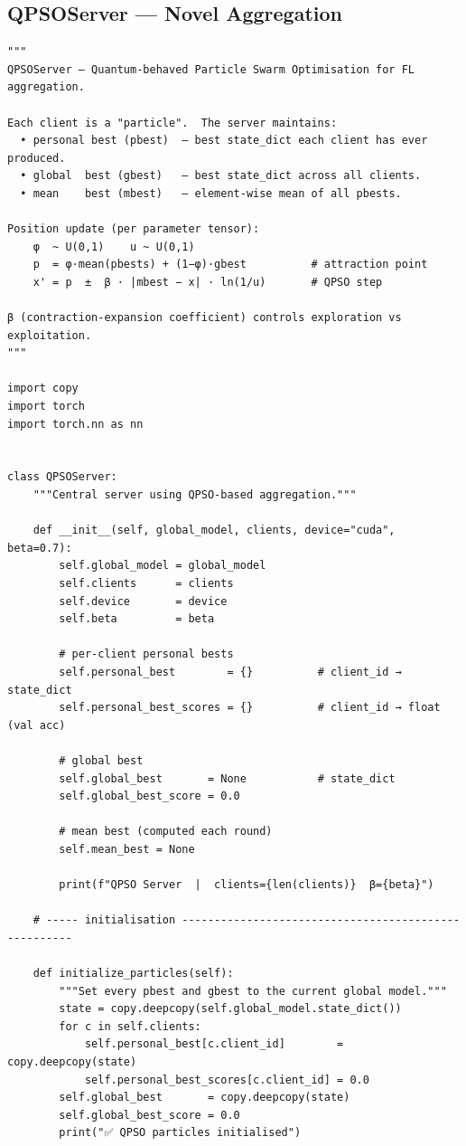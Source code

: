 \subsection{QPSOServer --- Novel Aggregation}
\begin{lstlisting}[caption={QPSO Server Aggregation (server\_qpso.py)}, label={lst:qpso}]
"""
QPSOServer — Quantum-behaved Particle Swarm Optimisation for FL aggregation.

Each client is a "particle".  The server maintains:
  • personal best (pbest)  — best state_dict each client has ever produced.
  • global  best (gbest)   — best state_dict across all clients.
  • mean    best (mbest)   — element-wise mean of all pbests.

Position update (per parameter tensor):
    φ  ~ U(0,1)    u ~ U(0,1)
    p  = φ·mean(pbests) + (1−φ)·gbest          # attraction point
    x' = p  ±  β · |mbest − x| · ln(1/u)       # QPSO step

β (contraction-expansion coefficient) controls exploration vs exploitation.
"""

import copy
import torch
import torch.nn as nn


class QPSOServer:
    """Central server using QPSO-based aggregation."""

    def __init__(self, global_model, clients, device="cuda", beta=0.7):
        self.global_model = global_model
        self.clients      = clients
        self.device       = device
        self.beta         = beta

        # per-client personal bests
        self.personal_best        = {}          # client_id → state_dict
        self.personal_best_scores = {}          # client_id → float (val acc)

        # global best
        self.global_best       = None           # state_dict
        self.global_best_score = 0.0

        # mean best (computed each round)
        self.mean_best = None

        print(f"QPSO Server  |  clients={len(clients)}  β={beta}")

    # ----- initialisation -----------------------------------------------------

    def initialize_particles(self):
        """Set every pbest and gbest to the current global model."""
        state = copy.deepcopy(self.global_model.state_dict())
        for c in self.clients:
            self.personal_best[c.client_id]        = copy.deepcopy(state)
            self.personal_best_scores[c.client_id] = 0.0
        self.global_best       = copy.deepcopy(state)
        self.global_best_score = 0.0
        print("✅ QPSO particles initialised")


\end{lstlisting}
